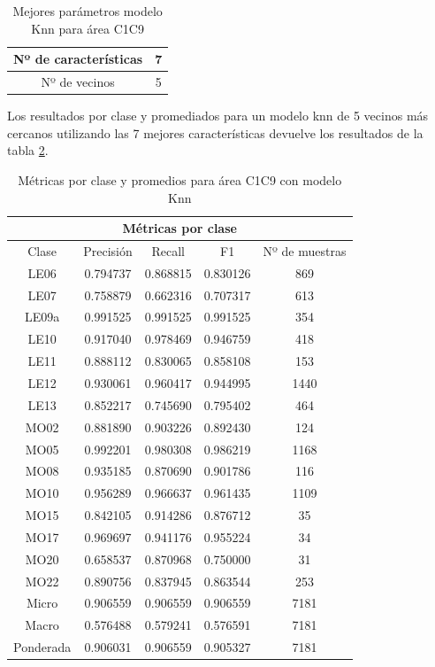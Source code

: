 \begin{table}[H]
	\centering
	\captionsetup{justification=centering}
	\begin{tabular}{|c|c|}
		\hline
		Nº de características & 7 \\ \hline
		Nº de vecinos & 5 \\ \hline
	\end{tabular}
	\caption{Mejores parámetros modelo Knn para área C1C9}
	\label{res:knn_gs_c1c9}
\end{table}

Los resultados por clase y promediados para un modelo knn de 5 vecinos más cercanos utilizando las 7 mejores características devuelve los resultados de la tabla \ref{res:knn_report_c1c9}.

\begin{table}[H]
	\centering
	\captionsetup{justification=centering}
	\begin{tabular}{|c|c|c|c|c|}
		\hline
		\multicolumn{5}{|c|}{Métricas por clase} \\ \hline
		Clase & Precisión & Recall & F1 & Nº de muestras \\ \hline \hline
		LE06 & 0.794737 & 0.868815 & 0.830126 & 869 \\ \hline
		LE07 & 0.758879 & 0.662316 & 0.707317 & 613 \\ \hline
		LE09a & 0.991525 & 0.991525 & 0.991525 & 354 \\ \hline
		LE10 & 0.917040 & 0.978469 & 0.946759 & 418 \\ \hline
		LE11 & 0.888112 & 0.830065 & 0.858108 & 153 \\ \hline
		LE12 & 0.930061 & 0.960417 & 0.944995 & 1440 \\ \hline
		LE13 & 0.852217 & 0.745690 & 0.795402 & 464 \\ \hline
		MO02 & 0.881890 & 0.903226 & 0.892430 & 124 \\ \hline
		MO05 & 0.992201 & 0.980308 & 0.986219 & 1168 \\ \hline
		MO08 & 0.935185 & 0.870690 & 0.901786 & 116 \\ \hline
		MO10 & 0.956289 & 0.966637 & 0.961435 & 1109 \\ \hline
		MO15 & 0.842105 & 0.914286 & 0.876712 & 35 \\ \hline
		MO17 & 0.969697 & 0.941176 & 0.955224 & 34 \\ \hline
		MO20 & 0.658537 & 0.870968 & 0.750000 & 31 \\ \hline
		MO22 & 0.890756 & 0.837945 & 0.863544 & 253 \\ \hline
		Micro & 0.906559 & 0.906559 & 0.906559 & 7181 \\ \hline
		Macro & 0.576488 & 0.579241 & 0.576591 & 7181 \\ \hline
		Ponderada & 0.906031 & 0.906559 & 0.905327 & 7181 \\ \hline
	\end{tabular}
	\caption{Métricas por clase y promedios para área C1C9 con modelo Knn}
	\label{res:knn_report_c1c9}	
\end{table}

